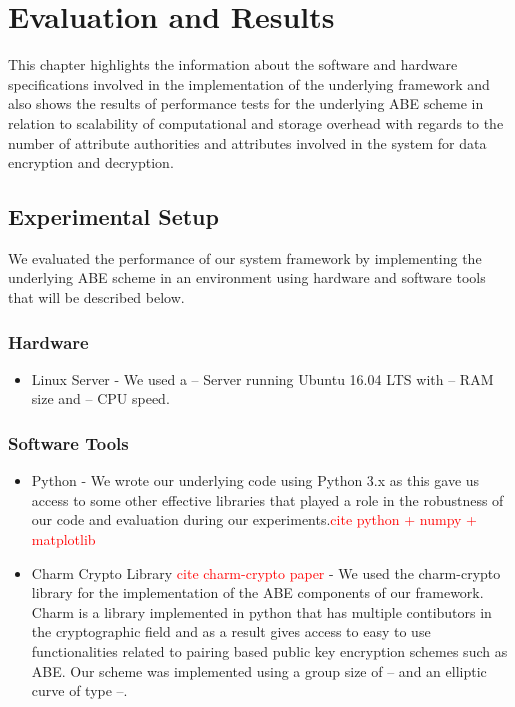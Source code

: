 \chapter{Evaluation and Results}
\label{chap:evaluation_and_results}

This chapter highlights the information about the software and hardware specifications involved in the implementation of the underlying framework and also shows the results of performance tests for the underlying ABE scheme in relation to scalability of computational and storage overhead with regards to the number of attribute authorities and attributes involved in the system for data encryption and decryption.

\section{Experimental Setup}

We evaluated the performance of our system framework by implementing the underlying ABE scheme in an environment using hardware and software tools that will be described below.

\subsection*{Hardware}
\begin{itemize}
	\item Linux Server - We used a -- Server running Ubuntu 16.04 LTS with -- RAM size and -- CPU speed.
\end{itemize}

\subsection*{Software Tools}
\begin{itemize}
	\item Python - We wrote our underlying code using Python 3.x as this gave us access to some other effective libraries that played a role in the robustness of our code and evaluation during our experiments.\textcolor{red}{cite python + numpy + matplotlib}
	
	\item Charm Crypto Library \textcolor{red}{cite charm-crypto paper} - We used the charm-crypto library for the implementation of the ABE components of our framework. Charm is a library implemented in python that has multiple contibutors in the cryptographic field and as a result gives access to easy to use functionalities related to pairing based public key encryption schemes such as ABE. Our scheme was implemented using a group size of -- and an elliptic curve of type --.
\end{itemize}

